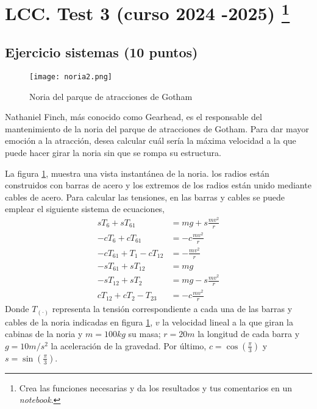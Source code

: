 \section{LCC. Test 3 (curso 2024 -2025) \protect\footnote{Crea las funciones necesarias  y da los resultados y tus comentarios en un \emph{notebook}.}}

\subsection*{Ejercicio sistemas (\textbf{10 puntos})}
\begin{figure}[h]
	\centering
	\texttt{[image: noria2.png]}
	\caption{Noria del parque de atracciones de Gotham}
	\label{fig:1}
\end{figure}

Nathaniel Finch, más conocido como Gearhead, es el responsable del mantenimiento de la noria del parque de atracciones de Gotham. Para dar mayor emoción a la atracción, desea calcular cuál sería la máxima velocidad a la que puede hacer girar la noria sin que se rompa su estructura.

La figura \ref{fig:1}, muestra una vista instantánea de la noria. los radios están construidos con barras de acero y los extremos de los radios están unido mediante cables de acero. Para calcular las tensiones, en las barras y cables se puede emplear el siguiente sistema de ecuaciones,
\begin{align}
	sT_6+sT_{61} &= mg + s\frac{mv^2}{r}\\
	- cT_6+ cT_{61} &= -c\frac{mv^2}{r}\\
	-cT_{61} + T_1 - cT_{12} &= -\frac{mv^2}{r}\\
	- sT_{61} + sT_{12}   &= mg\\
	-sT_{12} + sT_{2} &= mg -s\frac{mv^2}{r}\\
	cT_{12}+cT_{2}-T_{23} &= -c\frac{mv^2}{r}
\end{align}
Donde $T_{(\cdot)}$ representa la tensión correspondiente a cada una de las barras y cables de la noria indicadas en figura \ref{fig:1}, $v$ la velocidad lineal a la que giran la cabinas de la noria y $m = 100kg$ su masa; $r = 20m$ la longitud de cada barra y $g=10m/s^2$ la aceleración de la gravedad. Por último, $c = \cos(\frac{\pi}{3})$ y $s = \sin(\frac{\pi}{3})$.

